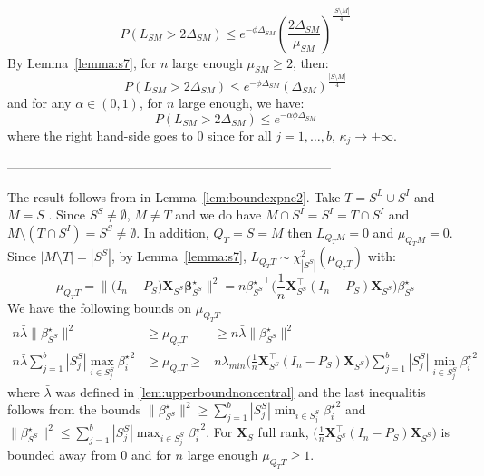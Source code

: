 \documentclass[aos]{imsart}
\theoremstyle{plain}
\newcommand{\bs}{\boldsymbol}
\begin{document}
\begin{supplement}
\begin{equation}\label{eq:randomeqeee}
    P(L_{SM}> 2\Delta_{SM}) \leq e^{-\phi\Delta_{SM}}\left(\frac{2\Delta_{SM}}{\mu_{SM}}\right)^{\frac{|S\setminus M|}{4}}
\end{equation} 
By Lemma~\ref{lemma:s7}, for $n$ large enough $\mu_{SM} \geq 2$, then:
\begin{equation}\label{eq:randomeqeee}
    P(L_{SM}> 2\Delta_{SM}) \leq e^{-\phi\Delta_{SM}}\left(\Delta_{SM}\right)^{\frac{|S\setminus M|}{4}}
\end{equation} 
and for any $\alpha\in(0,1)$, for $n$ large enough, we have:
\begin{equation}\label{eq:randomeqeee}
    P(L_{SM}> 2\Delta_{SM}) \leq e^{-\alpha\phi\Delta_{SM}}
\end{equation} 
where the right hand-side goes to 0 since for all $j=1,\ldots,b$, $\kappa_j \to +\infty$. 

-----------------------------------------------------------------------------

The result follows from in Lemma~\ref{lem:boundexpnc2}. Take $T=S^L\cup S^I$ and $M=S$ . Since $S^S\neq \emptyset$, $M\neq T$ and we do have $M\cap S^I=S^I=T\cap S^I$ and $M\setminus (T\cap S^I)=S^S\neq \emptyset$. In addition, $Q_{T}=S=M$ then $L_{Q_TM}=0$ and $\mu_{Q_TM}=0$. Since $|M\setminus T|=|S^S|$, by Lemma~\ref{lemma:s7},  $L_{Q_TT}\sim \chi_{|S^S|}^2(\mu_{Q_TT})$ with:
$$
\mu_{Q_TT}= \|\big(I_n-P_S\big) \bs X_{S^S} \bs \beta^{\star}_{S^S}\|^2 = n {\beta^{\star}_{S^S}}^\top \Big(\frac1n \bs X_{S^S}^\top(I_n-P_S)\bs X_{S^S}\Big)\beta^{\star}_{S^S}$$
We have the following bounds on $\mu_{Q_TT}$
\begin{eqnarray*}
  n\bar{\lambda}\|\beta^{\star}_{S^S}\|^2 &\geq \mu_{Q_TT} &\geq  n\bar{\lambda}\|\beta^{\star}_{S^S}\|^2 \\
    n\bar{\lambda}\sum_{j=1}^b|S_j^S|\max_{i\in S_j^S}{\beta_i^{\star}}^2  &\geq  \mu_{Q_TT} \geq & n\lambda_{min}\Big(\frac1n \bs X_{S^S}^\top(I_n-P_S)\bs X_{S^S}\Big)\sum_{j=1}^b|S_j^S|\min_{i\in S_j^S}{\beta_i^{\star}}^2
\end{eqnarray*}
where $\bar{\lambda}$ was defined in \eqref{lem:upperboundnoncentral} and the last inequalitis follows from the bounds $\|\beta^{\star}_{S^S}\|^2 \geq \sum_{j=1}^b|S_j^S|\min_{i\in S_j^S}{\beta_i^{\star}}^2$ and $\|\beta^{\star}_{S^S}\|^2\leq \sum_{j=1}^b|S_j^S|\max_{i\in S_j^S}{\beta_i^{\star}}^2$. 
For $\bs X_S$ full rank, $\Big(\frac1n \bs X_{S^S}^\top(I_n-P_S)\bs X_{S^S}\Big)$ is bounded away from 0 and for $n$ large enough $\mu_{Q_TT}\geq 1$.


\end{supplement}
\end{document}
